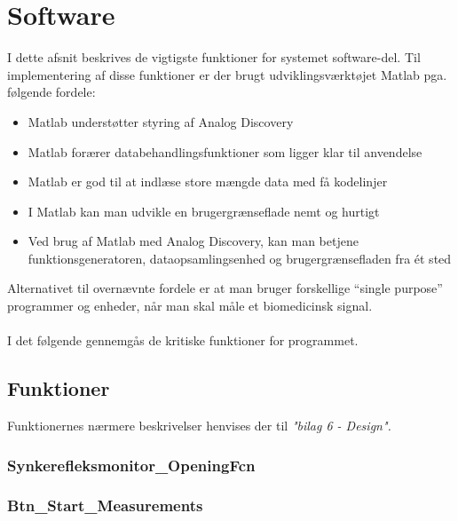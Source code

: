 \section{Software}

I dette afsnit beskrives de vigtigste funktioner for systemet software-del. Til implementering af disse funktioner er der brugt udviklingsværktøjet Matlab pga. følgende fordele:

\begin{itemize}
\item  Matlab understøtter styring af Analog Discovery 
\item Matlab forærer databehandlingsfunktioner som ligger klar til anvendelse
\item Matlab er god til at indlæse store mængde data med få kodelinjer
\item I Matlab kan man udvikle en brugergrænseflade nemt og hurtigt 
\item Ved brug af Matlab med Analog Discovery, kan man betjene  funktionsgeneratoren, dataopsamlingsenhed og brugergrænsefladen  fra ét sted   
\end{itemize}  

Alternativet til overnævnte fordele er at man bruger forskellige “single purpose” programmer og enheder, når man skal måle et biomedicinsk signal. \\ \\
I det følgende gennemgås de kritiske funktioner for programmet.

\pagebreak

\subsection{Funktioner}
Funktionernes nærmere beskrivelser henvises der til \textit{"bilag 6 - Design".}

\subsubsection{Synkerefleksmonitor\_OpeningFcn}





\subsubsection{Btn\_Start\_Measurements}



